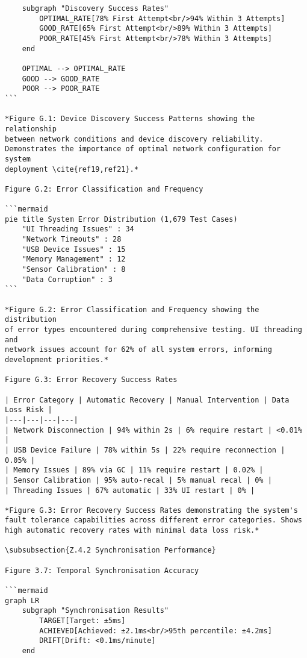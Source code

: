 \begin{verbatim}
    subgraph "Discovery Success Rates"
        OPTIMAL_RATE[78% First Attempt<br/>94% Within 3 Attempts]
        GOOD_RATE[65% First Attempt<br/>89% Within 3 Attempts]
        POOR_RATE[45% First Attempt<br/>78% Within 3 Attempts]
    end

    OPTIMAL --> OPTIMAL_RATE
    GOOD --> GOOD_RATE
    POOR --> POOR_RATE
```

*Figure G.1: Device Discovery Success Patterns showing the relationship
between network conditions and device discovery reliability.
Demonstrates the importance of optimal network configuration for system
deployment \cite{ref19,ref21}.*

Figure G.2: Error Classification and Frequency

```mermaid
pie title System Error Distribution (1,679 Test Cases)
    "UI Threading Issues" : 34
    "Network Timeouts" : 28
    "USB Device Issues" : 15
    "Memory Management" : 12
    "Sensor Calibration" : 8
    "Data Corruption" : 3
```

*Figure G.2: Error Classification and Frequency showing the distribution
of error types encountered during comprehensive testing. UI threading and
network issues account for 62% of all system errors, informing
development priorities.*

Figure G.3: Error Recovery Success Rates

| Error Category | Automatic Recovery | Manual Intervention | Data Loss Risk |
|---|---|---|---|
| Network Disconnection | 94% within 2s | 6% require restart | <0.01% |
| USB Device Failure | 78% within 5s | 22% require reconnection | 0.05% |
| Memory Issues | 89% via GC | 11% require restart | 0.02% |
| Sensor Calibration | 95% auto-recal | 5% manual recal | 0% |
| Threading Issues | 67% automatic | 33% UI restart | 0% |

*Figure G.3: Error Recovery Success Rates demonstrating the system's
fault tolerance capabilities across different error categories. Shows
high automatic recovery rates with minimal data loss risk.*

\subsubsection{Z.4.2 Synchronisation Performance}

Figure 3.7: Temporal Synchronisation Accuracy

```mermaid
graph LR
    subgraph "Synchronisation Results"
        TARGET[Target: ±5ms]
        ACHIEVED[Achieved: ±2.1ms<br/>95th percentile: ±4.2ms]
        DRIFT[Drift: <0.1ms/minute]
    end


\end{verbatim}
